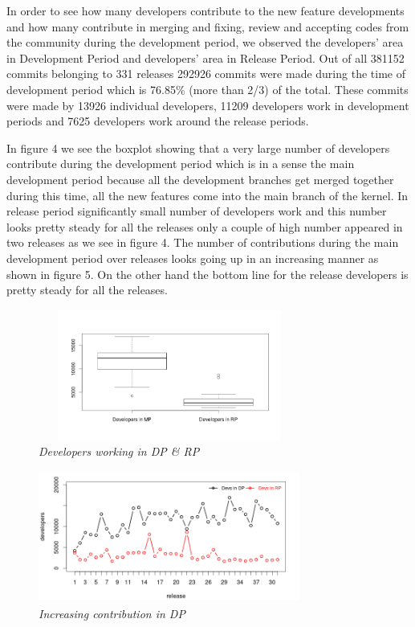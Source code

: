 \documentclass{acm_proc_article-sp}
\begin{document}
In order to see how many developers contribute to the new feature developments and how many contribute in merging and fixing, review and accepting codes from the community during the development period, we observed the developers' area in Development Period and developers' area in Release Period. Out of all 381152 commits belonging to 331 releases 292926 commits were made during the time of development period which is 76.85\% (more than 2/3) of the total. These commits were made by 13926 individual developers, 11209 developers work in development periods and 7625 developers work around the release periods.

In figure 4 we see the boxplot showing that a very large number of developers contribute during the development period which is in a sense the main development period because all the development branches get merged together during this time, all the new features come into the main branch of the kernel. In release period significantly small number of developers work and this number looks pretty steady for all the releases only a couple of high number appeared in two releases as we see in figure 4. The number of contributions during the main development period over releases looks going up in an increasing manner as shown in figure 5. On the other hand the bottom line for the release developers is pretty steady for all the releases.

\begin{figure}
\begin{center}
\includegraphics[height=1.7in,width=3.4in]{devsMPRPbox.png}
\caption{\small \sl Developers working in DP \& RP}
\end{center}
\end{figure}

\begin{figure}
\begin{center}
\includegraphics[height=1.7in,width=3.4in]{devsMPRP.png}
\caption{\small \sl Increasing contribution in DP}
\end{center}
\end{figure}
\end{document}
